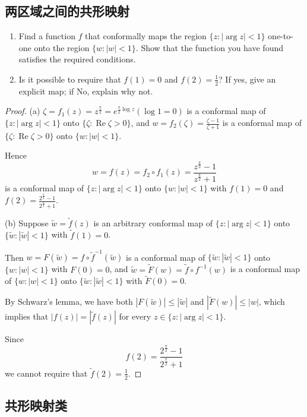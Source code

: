 \subsection{两区域之间的共形映射}

\begin{exercise}[Illinois]
\begin{enumerate}
		\item Find a function $f$ that conformally maps the region $\{z:|\arg z|<1\}$ one-to-one onto the region $\{w:|w|<1\}$. Show that the function you have found satisfies the required conditions.
		\item Is it possible to require that $f(1)=0$ and $f(2)=\frac{1}{2}$? If yes, give an explicit map; if No, explain why not.
	\end{enumerate}
\end{exercise}
\begin{proof}
(a) $\zeta=f_1(z)=z^{\frac{\pi}{2}}=e^{\frac{\pi}{2} \log z}(\log 1=0)$ is a conformal map of $\{z : |\arg z|<1\}$ onto $\{\zeta: \operatorname{Re} \zeta>0\}$, and $w=f_2(\zeta)=\frac{\zeta-1}{\zeta+1}$ is a conformal map of $\{\zeta: \operatorname{Re} \zeta>0\}$ onto $\{w:|w|<1\}$.

Hence
\[
w=f(z)=f_2 \circ f_1(z)=\frac{z^{\frac{\pi}{2}}-1}{z^{\frac{\pi}{2}}+1}
\]
is a conformal map of $\{z:|\arg z|<1\}$ onto $\{w:|w|<1\}$ with $f(1)=0$ and $f(2)=\frac{2^{\frac{\pi}{2}}-1}{2^{\frac{\pi}{2}}+1}$.

(b) Suppose $\widetilde{w}=\widetilde{f}(z)$ is an arbitrary conformal map of $\{z:|\arg z|<1\}$ onto $\{\widetilde{w}:|\widetilde{w}|<1\}$ with $\widetilde{f}(1)=0$.

Then $w=F(\widetilde{w})=f \circ \widetilde{f}^{-1}(\widetilde{w})$ is a conformal map of $\{\widetilde{w}:|\widetilde{w}|<1\}$ onto $\{w:|w|<1\}$ with $F(0)=0$, and $\widetilde{w}=\widetilde{F}(w)=\widetilde{f} \circ f^{-1}(w)$ is a conformal map of $\{w:|w|<1\}$ onto $\{\widetilde{w}:|\widetilde{w}|<1\}$ with $\widetilde{F}(0)=0$.

By Schwarz's lemma, we have both $|F(\widetilde{w})| \leq|\widetilde{w}|$ and $|\widetilde{F}(w)| \leq|w|$, which implies that $|f(z)|=|\widetilde{f}(z)|$ for every $z \in\{z:|\arg z|<1\}$.

Since
\[
f(2)=\frac{2^{\frac{\pi}{2}}-1}{2^{\frac{\pi}{2}}+1}
\]
we cannot require that $\widetilde{f}(2)=\frac{1}{2}$.
\end{proof}

\subsection{共形映射类}

